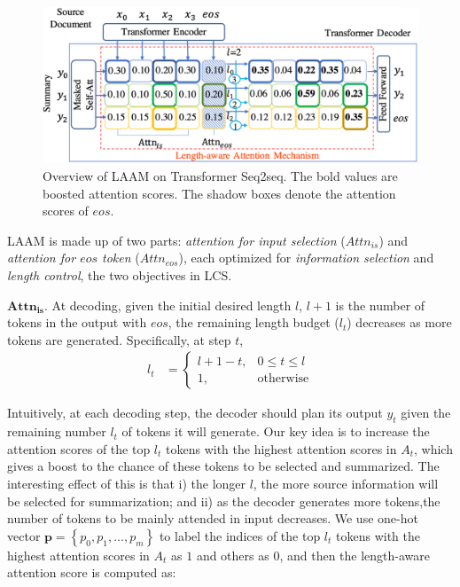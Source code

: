 \begin{figure}[th]
	\centering
	\includegraphics[width=1.0\linewidth]{model.pdf}
	\caption{Overview of LAAM on Transformer Seq2seq. The bold values are boosted attention scores. The shadow boxes denote the attention scores of $eos$.
	}
	\label{fig:model_main}
\end{figure}

LAAM is made up of two parts: {\em attention for input selection} 
($Attn_{is}$) and 
{\em attention for $eos$ token} ($Attn_{eos}$), each optimized for
\textit{information selection} and \textit{length control},
the two objectives in LCS.

$\bm{Attn_{is}}$. At decoding,
given the initial desired length $l$,  $l+1$ is the number of tokens in the output with $eos$, the remaining length budget ($l_t$)
decreases as more tokens are generated. Specifically, at step $t$,
\begin{align}
        l_t &=		
		\begin{cases}			
			l+1-t, &\mbox{$0\leq t \leq l$}\\			
			1, &\mbox{otherwise}			
		\end{cases}		
\end{align}

Intuitively, at each decoding step, 
the decoder should plan its output $y_t$ given the remaining number $l_t$ of 
tokens it will generate.
Our key idea is to increase the attention scores of the top $l_t$ tokens 
with the highest attention scores in $A_t$,
which gives a boost to the chance of these tokens 
to be selected and summarized.
The interesting effect of this is that i) the longer $l$, the more source 
information will be selected for summarization; and ii) as the decoder generates more tokens,the number of tokens to be mainly attended in input decreases.  
We use one-hot vector $\mathbf{p}=\left\{p_0,p_1,...,p_m\right\}$ to 
label the indices of the top $l_t$ tokens with the highest attention scores 
in $A_t$ as $1$ and others as $0$, and then 
the length-aware attention score is computed as:


